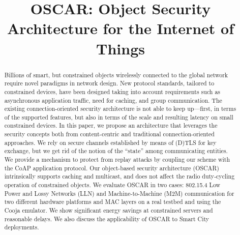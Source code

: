 \documentclass[conference]{IEEEtran}
\begin{document}
\title{OSCAR: Object Security Architecture for the Internet of Things}

\author{
	
	
}

\maketitle

\begin{abstract} Billions of smart, but constrained objects wirelessly connected
  to the global network require novel paradigms in network design. New
  protocol standards, tailored to constrained devices, have been designed taking
  into account requirements such as asynchronous application traffic, need for
  caching, and group communication. The existing connection-oriented security
  architecture is not able to keep up---first, in terms of the supported
  features, but also in terms of the scale and resulting latency on small
  constrained devices. In this paper, we propose an architecture that leverages
  the security concepts both from content-centric and traditional
  connection-oriented approaches. We rely on secure channels established by
  means of (D)TLS for key exchange, but we get rid of the notion of the
  ``state'' among communicating entities. We provide a mechanism to protect from
  replay attacks by coupling our scheme with the CoAP application protocol. Our
  object-based security architecture (OSCAR) intrinsically supports caching and
  multicast, and does not affect the radio duty-cycling operation of constrained
  objects. We evaluate OSCAR in two cases: 802.15.4 Low Power and Lossy
  Networks (LLN) and Machine-to-Machine (M2M) communication for two different
  hardware platforms and MAC layers on a real testbed and using the Cooja
  emulator. We show significant energy savings at constrained servers and
  reasonable delays. We also discuss the applicability of OSCAR to Smart City
  deployments.
\end{abstract}
\end{document}
